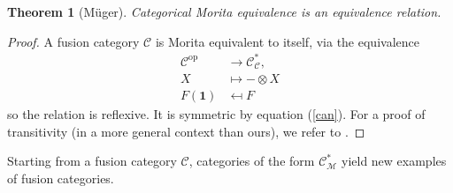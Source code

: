 \documentclass[11pt]{book}
\newtheorem{theorem}{Theorem}[section]
\theoremstyle{Rem}
\theoremstyle{definition}
\numberwithin{equation}{section}
\newcommand\ot{\otimes}
\newcommand\op{^{\text{op}}}
\newcommand\M{\mathcal{M}}
\newcommand\C{\mathcal C}
\newcommand{\ra}\rightarrow
\newcommand\one{\mathbf{1}}
\begin{document}
\begin{theorem}[M\"uger]
Categorical Morita equivalence is an equivalence relation.
\end{theorem}
\begin{proof}
A fusion category $\C$ is Morita equivalent to itself, via the equivalence \begin{align*}
	\C\op &\ra \C^*_\C,\\
	X&\mapsto -\ot X\\
	F(\one)&\mapsfrom F
\end{align*} so the relation is reflexive. It is symmetric by equation (\ref{can}). For a proof of transitivity (in a more general context than ours), we refer to \cite[Proposition 7.12.18]{EGNO}.
\end{proof}

Starting from a fusion category $\C$, categories of the form $\C^*_\M$ yield new examples of fusion categories.
\end{document}
